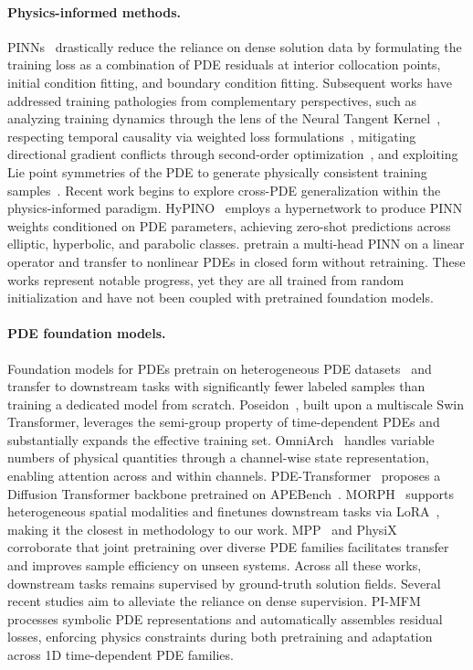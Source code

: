 \documentclass{article}
\begin{document}
\paragraph{Physics-informed methods.}
PINNs~\cite{raissi2019pinn} drastically reduce the reliance on dense solution data by formulating the training loss as a combination of PDE residuals at interior collocation points, initial condition fitting, and boundary condition fitting. Subsequent works have addressed training pathologies from complementary perspectives, such as analyzing training dynamics through the lens of the Neural Tangent Kernel~\cite{wang2020ntkpinn}, respecting temporal causality via weighted loss formulations~\cite{wang2022causalpinn}, mitigating directional gradient conflicts through second-order optimization~\cite{wang2025gradientalignment}, and exploiting Lie point symmetries of the PDE to generate physically consistent training samples~\cite{brandstetter2022lpsda}. Recent work begins to explore cross-PDE generalization within the physics-informed paradigm. HyPINO~\cite{bischof2025hypino_neurips} employs a hypernetwork to produce PINN weights conditioned on PDE parameters, achieving zero-shot predictions across elliptic, hyperbolic, and parabolic classes. \citet{auroy2025perturbativepinn} pretrain a multi-head PINN on a linear operator and transfer to nonlinear PDEs in closed form without retraining. These works represent notable progress, yet they are all trained from random initialization and have not been coupled with pretrained foundation models.


\paragraph{PDE foundation models.}
Foundation models for PDEs pretrain on heterogeneous PDE datasets~\cite{takamoto2022pdebench,ohana2024thewell,koehler2024apebench} and transfer to downstream tasks with significantly fewer labeled samples than training a dedicated model from scratch. Poseidon~\cite{herde2024poseidon}, built upon a multiscale Swin Transformer, leverages the semi-group property of time-dependent PDEs and substantially expands the effective training set.  OmniArch~\cite{chen2025omniarch} handles variable numbers of physical quantities through a channel-wise state representation, enabling attention across and within channels. PDE-Transformer~\cite{holzschuh2025pdetransformer} proposes a Diffusion Transformer backbone pretrained on APEBench~\cite{koehler2024apebench}. MORPH~\cite{rautela2025morph} supports heterogeneous spatial modalities and finetunes downstream tasks via LoRA~\cite{hu2022lora}, making it the closest in methodology to our work. MPP~\cite{mccabe2024mpp} and PhysiX~\cite{nguyen2025physix} corroborate that joint pretraining over diverse PDE families facilitates transfer and improves sample efficiency on unseen systems. Across all these works, downstream tasks remains supervised by ground-truth solution fields. Several recent studies aim to alleviate the reliance on dense supervision. PI-MFM~\cite{zhu2025pimfm} processes symbolic PDE representations and automatically assembles residual losses, enforcing physics constraints during both pretraining and adaptation across 1D time-dependent PDE families. 
\end{document}
